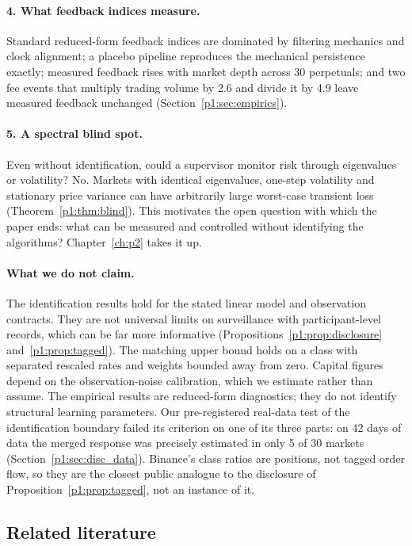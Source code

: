 \paragraph{4. What feedback indices measure.} Standard reduced-form feedback indices are dominated by filtering mechanics and clock alignment; a placebo pipeline reproduces the mechanical persistence exactly; measured feedback rises with market depth across 30 perpetuals; and two fee events that multiply trading volume by 2.6 and divide it by 4.9 leave measured feedback unchanged (Section~\ref{p1:sec:empirics}).

\paragraph{5. A spectral blind spot.} Even without identification, could a supervisor monitor risk through eigenvalues or volatility? No. Markets with identical eigenvalues, one-step volatility and stationary price variance can have arbitrarily large worst-case transient loss (Theorem~\ref{p1:thm:blind}). This motivates the open question with which the paper ends: what can be measured and controlled without identifying the algorithms? Chapter~\ref{ch:p2} takes it up.

\paragraph{What we do not claim.} The identification results hold for the stated linear model and observation contracts. They are not universal limits on surveillance with participant-level records, which can be far more informative (Propositions~\ref{p1:prop:disclosure} and~\ref{p1:prop:tagged}). The matching upper bound holds on a class with separated rescaled rates and weights bounded away from zero. Capital figures depend on the observation-noise calibration, which we estimate rather than assume. The empirical results are reduced-form diagnostics; they do not identify structural learning parameters. Our pre-registered real-data test of the identification boundary failed its criterion on one of its three parts: on 42 days of data the merged response was precisely estimated in only 5 of 30 markets (Section~\ref{p1:sec:disc_data}). Binance's class ratios are positions, not tagged order flow, so they are the closest public analogue to the disclosure of Proposition~\ref{p1:prop:tagged}, not an instance of it.

\subsection{Related literature}

